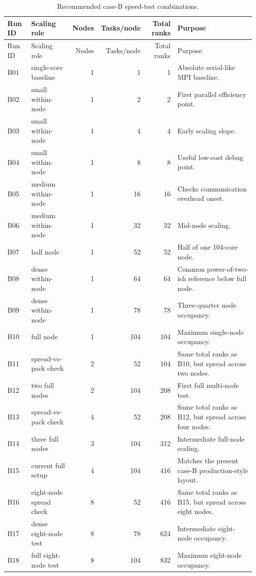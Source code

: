 \documentclass[11pt]{article}
\begin{document}
\footnotesize
\begin{longtable}{l>{\raggedright\arraybackslash}p{1.25in}rrr>{\raggedright\arraybackslash}p{2.05in}}
\caption{Recommended case-B speed-test combinations.}\\
\toprule
Run ID & Scaling role & Nodes & Tasks/node & Total ranks & Purpose \\
\midrule
\endfirsthead
\toprule
Run ID & Scaling role & Nodes & Tasks/node & Total ranks & Purpose \\
\midrule
\endhead
\bottomrule
\endfoot
B01 & single-core baseline & 1 & 1 & 1 & Absolute serial-like MPI baseline. \\
B02 & small within-node & 1 & 2 & 2 & First parallel efficiency point. \\
B03 & small within-node & 1 & 4 & 4 & Early scaling slope. \\
B04 & small within-node & 1 & 8 & 8 & Useful low-cost debug point. \\
B05 & medium within-node & 1 & 16 & 16 & Checks communication overhead onset. \\
B06 & medium within-node & 1 & 32 & 32 & Mid-node scaling. \\
B07 & half node & 1 & 52 & 52 & Half of one 104-core node. \\
B08 & dense within-node & 1 & 64 & 64 & Common power-of-two-ish reference below full node. \\
B09 & dense within-node & 1 & 78 & 78 & Three-quarter node occupancy. \\
B10 & full node & 1 & 104 & 104 & Maximum single-node occupancy. \\
B11 & spread-vs-pack check & 2 & 52 & 104 & Same total ranks as B10, but spread across two nodes. \\
B12 & two full nodes & 2 & 104 & 208 & First full multi-node test. \\
B13 & spread-vs-pack check & 4 & 52 & 208 & Same total ranks as B12, but spread across four nodes. \\
B14 & three full nodes & 3 & 104 & 312 & Intermediate full-node scaling. \\
B15 & current full setup & 4 & 104 & 416 & Matches the present case-B production-style layout. \\
B16 & eight-node spread check & 8 & 52 & 416 & Same total ranks as B15, but spread across eight nodes. \\
B17 & dense eight-node test & 8 & 78 & 624 & Intermediate eight-node occupancy. \\
B18 & full eight-node test & 8 & 104 & 832 & Maximum eight-node occupancy. \\

\end{longtable}
\end{document}
